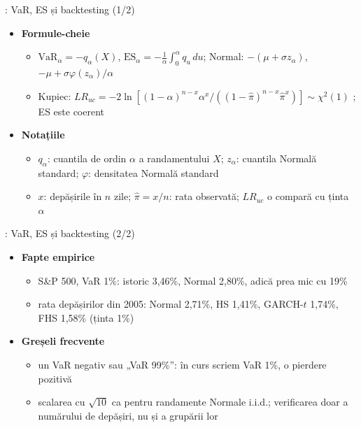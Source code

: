 \begin{frame}{: VaR, ES și backtesting (1/2)}
\itemsize{\small}
\begin{itemize}
    \item \textbf{Formule-cheie}
    \begin{itemize}
        \item $\mathrm{VaR}_\alpha = -q_\alpha(X)$, $\mathrm{ES}_\alpha = -\frac1\alpha\int_0^\alpha q_u\,du$; Normal: $-(\mu + \sigma z_\alpha)$, $-\mu + \sigma\varphi(z_\alpha)/\alpha$
        \item Kupiec: $LR_{uc} = -2\ln[(1-\alpha)^{n-x}\alpha^x/((1-\hat\pi)^{n-x}\hat\pi^x)] \sim \chi^2(1)$ ; ES este coerent 
    \end{itemize}
    \item \textbf{Notațiile}
    \begin{itemize}
        \item $q_\alpha$: cuantila de ordin $\alpha$ a randamentului $X$; $z_\alpha$: cuantila Normală standard; $\varphi$: densitatea Normală standard
        \item $x$: depășirile în $n$ zile; $\hat\pi = x/n$: rata observată; $LR_{uc}$ o compară cu ținta $\alpha$
    \end{itemize}
\end{itemize}
\end{frame}

\begin{frame}{: VaR, ES și backtesting (2/2)}
\itemsize{\small}
\begin{itemize}
    \item \textbf{Fapte empirice}
    \begin{itemize}
        \item S\&P 500, VaR 1\%: istoric 3{,}46\%, Normal 2{,}80\%, adică prea mic cu 19\%
        \item rata depășirilor din 2005: Normal 2{,}71\%, HS 1{,}41\%, GARCH-$t$ 1{,}74\%, FHS 1{,}58\% (ținta 1\%)
    \end{itemize}
    \item \textbf{Greșeli frecvente}
    \begin{itemize}
        \item un VaR negativ sau „VaR 99\%”: în curs scriem VaR 1\%, o pierdere pozitivă
        \item scalarea cu $\sqrt{10}$ ca pentru randamente Normale i.i.d.; verificarea doar a numărului de depășiri, nu și a grupării lor
    \end{itemize}
\end{itemize}
\end{frame}

